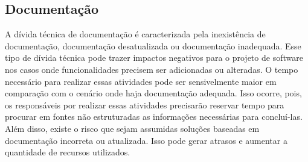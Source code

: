 


\subsection{Documentação}

 A dívida técnica de documentação é caracterizada pela  inexistência de documentação, documentação desatualizada ou documentação inadequada. Esse tipo de dívida técnica pode trazer impactos negativos para o projeto de software nos casos onde funcionalidades precisem ser adicionadas ou alteradas. O tempo necessário para realizar essas atividades pode ser sensivelmente maior em comparação com o cenário onde haja documentação adequada. Isso ocorre, pois, os responsáveis por realizar essas atividades precisarão reservar tempo para procurar em fontes não estruturadas as informações necessárias para concluí-las. Além disso, existe o risco que sejam assumidas soluções baseadas em documentação incorreta ou atualizada. Isso pode gerar atrasos e aumentar a quantidade de recursos utilizados.

